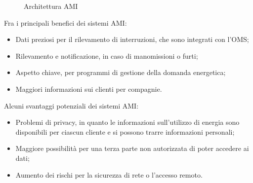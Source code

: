 \begin{figure}[h] 
\caption{Architettura AMI}\label{fig:2_12}
\end{figure}

Fra i principali benefici dei sistemi AMI:
\begin{itemize}
	\item Dati preziosi per il rilevamento di interruzioni, che sono integrati con l'OMS;
	\item Rilevamento e notificazione, in caso di manomissioni o furti;
	\item Aspetto chiave, per programmi di gestione della domanda energetica;
	\item Maggiori informazioni sui clienti per compagnie.
\end{itemize}
Alcuni svantaggi potenziali dei sistemi AMI:
\begin{itemize}
	\item Problemi di privacy, in quanto le informazioni sull'utilizzo di energia sono disponibili per ciascun cliente e si possono trarre informazioni personali;
	\item Maggiore possibilità per una terza parte non autorizzata di poter accedere ai dati;
	\item Aumento dei rischi per la sicurezza di rete o l'accesso remoto.
\end{itemize}
 
